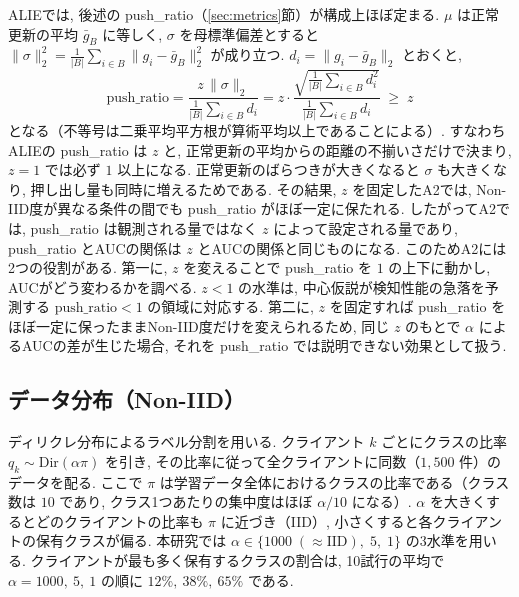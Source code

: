 \documentclass[a4j, twocolumn, dvipdfmx]{jsarticle}
\newcommand{\PushRatio}{\textrm{push\_ratio}}
\begin{document}
ALIEでは, 後述の \PushRatio{}（\ref{sec:metrics}節）が構成上ほぼ定まる. $\mu$ は正常更新の平均 $\bar{g}_B$ に等しく, $\sigma$ を母標準偏差とすると $\|\sigma\|_2^2 = \frac{1}{|B|}\sum_{i \in B}\|g_i - \bar{g}_B\|_2^2$ が成り立つ. $d_i = \|g_i - \bar{g}_B\|_2$ とおくと,
\begin{equation}
\PushRatio
= \frac{z\,\|\sigma\|_2}{\frac{1}{|B|}\sum_{i \in B} d_i}
= z \cdot \frac{\sqrt{\frac{1}{|B|}\sum_{i \in B} d_i^2}}{\frac{1}{|B|}\sum_{i \in B} d_i}
\;\ge\; z
\label{eq:alie-pushratio}
\end{equation}
となる（不等号は二乗平均平方根が算術平均以上であることによる）. すなわちALIEの \PushRatio{} は $z$ と, 正常更新の平均からの距離の不揃いさだけで決まり, $z=1$ では必ず $1$ 以上になる. 正常更新のばらつきが大きくなると $\sigma$ も大きくなり, 押し出し量も同時に増えるためである. その結果, $z$ を固定したA2では, Non-IID度が異なる条件の間でも \PushRatio{} がほぼ一定に保たれる. したがってA2では, \PushRatio{} は観測される量ではなく $z$ によって設定される量であり, \PushRatio{} とAUCの関係は $z$ とAUCの関係と同じものになる. このためA2には2つの役割がある. 第一に, $z$ を変えることで \PushRatio{} を $1$ の上下に動かし, AUCがどう変わるかを調べる. $z<1$ の水準は, 中心仮説が検知性能の急落を予測する $\PushRatio<1$ の領域に対応する. 第二に, $z$ を固定すれば \PushRatio{} をほぼ一定に保ったままNon-IID度だけを変えられるため, 同じ $z$ のもとで $\alpha$ によるAUCの差が生じた場合, それを \PushRatio{} では説明できない効果として扱う.



\subsection{データ分布（Non-IID）}
\label{sec:data-noniid}

ディリクレ分布によるラベル分割を用いる. クライアント $k$ ごとにクラスの比率 $q_k \sim \mathrm{Dir}(\alpha \pi)$ を引き, その比率に従って全クライアントに同数（$1{,}500$ 件）のデータを配る. ここで $\pi$ は学習データ全体におけるクラスの比率である（クラス数は $10$ であり, クラス1つあたりの集中度はほぼ $\alpha/10$ になる）. $\alpha$ を大きくするとどのクライアントの比率も $\pi$ に近づき（IID）, 小さくすると各クライアントの保有クラスが偏る. 本研究では $\alpha \in \{1000\;(\approx\text{IID}),\; 5,\; 1\}$ の3水準を用いる. クライアントが最も多く保有するクラスの割合は, 10試行の平均で $\alpha=1000,\ 5,\ 1$ の順に $12\%,\ 38\%,\ 65\%$ である.
\end{document}
